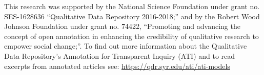 \documentclass[sigchi]{acmart}
\begin{document}
\begin{acks}
This research was supported by the National Science Foundation under grant no. SES-1628636 “Qualitative Data Repository 2016-2018;” and by the Robert Wood Johnson Foundation under grant no. 74422, “Promoting and advancing the concept of open annotation in enhancing the credibility of qualitative research to empower social  change;”. To find out more information about the Qualitative Data Repository's Annotation for Transparent Inquiry (ATI) and to read excerpts from annotated articles see: \hyperlink{https://qdr.syr.edu/ati/ati-models}{https://qdr.syr.edu/ati/ati-models}
\end{acks}



\end{document}
